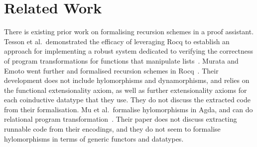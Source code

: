 \documentclass[a4paper,UKenglish,cleveref, autoref, thm-restate]{lipics-v2021}
\begin{document}
\section{Related Work}
\label{sec:related-work}

%


There is existing prior work on formalising recursion schemes in a proof
assistant.  Tesson et al.\ demonstrated the efficacy of leveraging Rocq to
establish an approach for implementing a robust system dedicated to verifying
the correctness of program transformations for functions that manipulate
lists~\cite{10.1007/978-3-642-17796-5_10}. Murata and Emoto went further and
formalised recursion schemes in Rocq~\cite{MurataE19}. Their development does not
include hylomorphisms and dynamorphisms, and relies on the functional
extensionality axiom, as well as further extensionality axioms for each
coinductive datatype that they use. They do not discuss the extracted code from
their formalisation.  Mu et al.\ formalise hylomorphisms in Agda, and can do
relational program transformation~\cite{DBLP:journals/jfp/MuKJ09}. Their paper
does not discuss extracting runnable code from their encodings, and they do not
seem to formalise hylomorphisms in terms of generic functors and datatypes.
\end{document}
